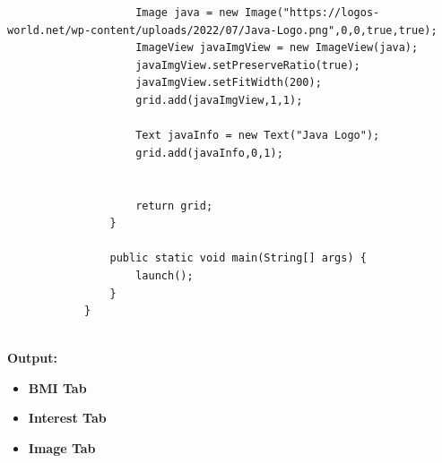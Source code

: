 \documentclass{book}
\begin{document}
{\begin{enumerate}
\begin{verbatim}
                    Image java = new Image("https://logos-world.net/wp-content/uploads/2022/07/Java-Logo.png",0,0,true,true);
                    ImageView javaImgView = new ImageView(java);
                    javaImgView.setPreserveRatio(true);
                    javaImgView.setFitWidth(200);
                    grid.add(javaImgView,1,1);

                    Text javaInfo = new Text("Java Logo");
                    grid.add(javaInfo,0,1);


                    return grid;
                }

                public static void main(String[] args) {
                    launch();
                }
            }
        
    \end{verbatim}
    \par
    \textbf{Output:}
    \begin{itemize} 
        \item { \textbf{BMI Tab}
        }
        \item{ \textbf{Interest Tab}
        }
        \item{ \textbf{Image Tab}
}
\end{itemize}
\end{enumerate}}
\end{document}

